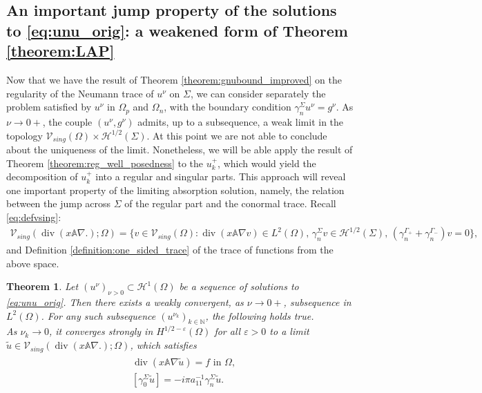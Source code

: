 \documentclass[report]{elsarticle}
\newtheorem{theorem}{Theorem}[section]
\numberwithin{theorem}{section}
\begin{document}
\subsection{An important jump property of the solutions to \eqref{eq:unu_orig}: a weakened form of Theorem \ref{theorem:LAP}}
\label{sec:result_decomposition}
Now that we have the result of Theorem \ref{theorem:gnubound_improved} on the regularity of the Neumann trace of $u^{\nu}$ on $\Sigma$, we can consider separately the problem satisfied by $u^{\nu}$ in $\Omega_p$ and $\Omega_n$, with the boundary condition $\gamma_{n}^{\Sigma}u^{\nu}=g^{\nu}$. As $\nu\rightarrow 0+$, the couple $(u^{\nu}, g^{\nu})$ admits, up to a subsequence, a weak limit in the topology $\mathcal{V}_{sing}(\Omega)\times \mathcal{H}^{1/2}(\Sigma)$. At this point we are not able to conclude about the uniqueness of the limit.
Nonetheless, we will be able apply the result of Theorem \ref{theorem:reg_well_posedness} to the $u^+_k$, which would yield the decomposition of $u^+_k$ into a regular and singular parts. This approach will reveal one important property of the limiting absorption solution, namely, the relation between the jump across $\Sigma$ of the regular part and the conormal trace. Recall \eqref{eq:defvsing}: 
\begin{align}
	\label{eq:vsingdiv}
	\mathcal{V}_{sing}(\operatorname{div}(x\mathbb{A}\nabla .); \Omega)=\{{v}\in \mathcal{V}_{sing}(\Omega): \operatorname{div}(x\mathbb{A}\nabla v)\in L^2(\Omega), \, \gamma_n^{\Sigma}v\in \mathcal{H}^{1/2}(\Sigma), \, (\gamma_n^{\Gamma_+}+\gamma_n^{\Gamma_{-}})v=0\},
\end{align}
and Definition \ref{definition:one_sided_trace} of the trace of functions from the above space.
\begin{theorem}
	\label{theorem:convergence_decomposition}
	Let $(u^{\nu})_{\nu>0}\subset \mathcal{H}^1(\Omega)$ be a sequence of solutions to \eqref{eq:unu_orig}. Then there exists a weakly convergent, as $\nu\rightarrow 0+$,  subsequence in $L^2(\Omega)$. For any such subsequence  $(u^{\nu_k})_{k\in\mathbb{N}}$, the following holds true. \\
	As $\nu_k\rightarrow 0$, it converges strongly in ${H}^{1/2-\varepsilon}(\Omega)$ for all $\varepsilon>0$ to a limit $\widetilde{u}\in \mathcal{V}_{sing}(\operatorname{div}(x\mathbb{A}\nabla .); \Omega)$, which satisfies
	\begin{align}
		\label{eq:bvpu}
		\begin{split}
			&\operatorname{div}(x\mathbb{A}\nabla \widetilde{u})=f \text{ in }\Omega,\\
			&[\gamma_0^{\Sigma}\widetilde{u}]=-i\pi a_{11}^{-1} \gamma_{n}^{\Sigma}\widetilde{u}.
		\end{split}
	\end{align}
\end{theorem}
\end{document}
